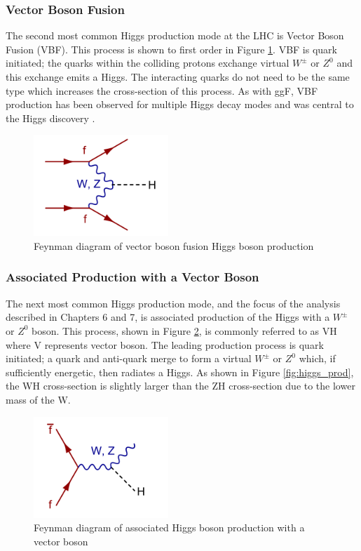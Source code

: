 \subsubsection{Vector Boson Fusion}
The second most common Higgs production mode at the LHC is Vector Boson Fusion (VBF). This process is shown to first order in Figure \ref{fig:vbf}. VBF is quark initiated; the quarks within the colliding protons exchange virtual $W^{\pm}$ or $Z^0$ and this exchange emits a Higgs. The interacting quarks do not need to be the same type which increases the cross-section of this process. As with ggF, VBF production has been observed for multiple Higgs decay modes and was central to the Higgs discovery \cite{higgs_disc_atlas}.

\begin{figure}[h]
    \centering
    \includegraphics[width=2in]{figures/chapter1/vbf.png}
    \caption{Feynman diagram of vector boson fusion Higgs boson production}
    \label{fig:vbf}
\end{figure}

\subsubsection{Associated Production with a Vector Boson}
The next most common Higgs production mode, and the focus of the analysis described in Chapters 6 and 7, is associated production of the Higgs with a $W^{\pm}$ or $Z^0$ boson. This process, shown in Figure \ref{fig:vh}, is commonly referred to as VH where V represents vector boson. The leading production process is quark initiated; a quark and anti-quark merge to form a virtual $W^{\pm}$ or $Z^0$ which, if sufficiently energetic, then radiates a Higgs. As shown in Figure \ref{fig:higgs_prod}, the WH cross-section is slightly larger than the ZH cross-section due to the lower mass of the W. 

\begin{figure}[h]
    \centering
    \includegraphics[width=2in]{figures/chapter1/vh.png}
    \caption{Feynman diagram of associated Higgs boson production with a vector boson}
    \label{fig:vh}
\end{figure}

